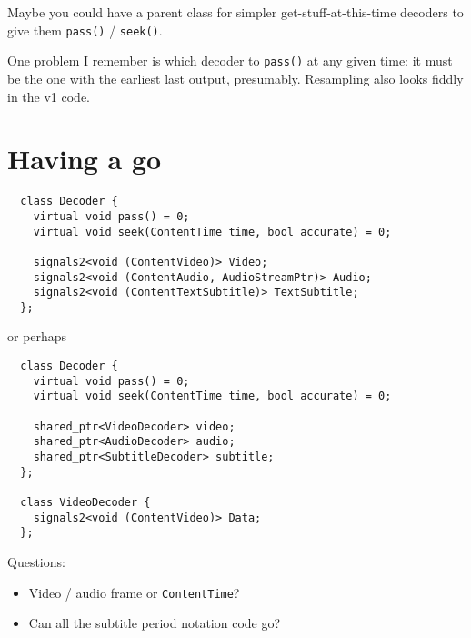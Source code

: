 \documentclass{article}
\begin{document}
Maybe you could have a parent class for simpler get-stuff-at-this-time
decoders to give them \texttt{pass()} / \texttt{seek()}.

One problem I remember is which decoder to \texttt{pass()} at any given time:
it must be the one with the earliest last output, presumably.
Resampling also looks fiddly in the v1 code.


\section{Having a go}

\begin{lstlisting}
  class Decoder {
    virtual void pass() = 0;
    virtual void seek(ContentTime time, bool accurate) = 0;

    signals2<void (ContentVideo)> Video;
    signals2<void (ContentAudio, AudioStreamPtr)> Audio;
    signals2<void (ContentTextSubtitle)> TextSubtitle;
  };
\end{lstlisting}

or perhaps

\begin{lstlisting}
  class Decoder {
    virtual void pass() = 0;
    virtual void seek(ContentTime time, bool accurate) = 0;

    shared_ptr<VideoDecoder> video;
    shared_ptr<AudioDecoder> audio;
    shared_ptr<SubtitleDecoder> subtitle;
  };

  class VideoDecoder {
    signals2<void (ContentVideo)> Data;
  };
\end{lstlisting}

Questions:
\begin{itemize}
\item Video / audio frame or \texttt{ContentTime}?
\item Can all the subtitle period notation code go?
\end{itemize}
\end{document}
